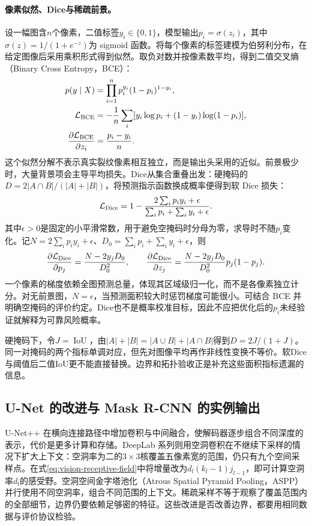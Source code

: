 \paragraph{像素似然、Dice与稀疏前景。}
设一幅图含$n$个像素，二值标签$y_i\in\{0,1\}$，模型输出$p_i=\sigma(z_i)$，其中$\sigma(z)=1/(1+e^{-z})$为 sigmoid 函数。将每个像素的标签建模为伯努利分布，在给定图像后采用乘积形式得到似然。取负对数并按像素数平均，得到二值交叉熵（Binary Cross Entropy，BCE）：
\begin{align}
 p(y\mid X)&=\prod_{i=1}^n p_i^{y_i}(1-p_i)^{1-y_i},\\
 \mathcal L_{\rm BCE}&=-\frac1n\sum_i[y_i\log p_i+(1-y_i)\log(1-p_i)],\\
 \frac{\partial\mathcal L_{\rm BCE}}{\partial z_i}&=\frac{p_i-y_i}{n}.
\end{align}
这个似然分解不表示真实裂纹像素相互独立，而是输出头采用的近似。前景极少时，大量背景项会主导平均损失。Dice从集合重叠出发：硬掩码的$D=2|A\cap B|/(|A|+|B|)$，将预测指示函数换成概率便得到软 Dice 损失：
\begin{equation}
 \mathcal L_{\rm Dice}=1-\frac{2\sum_i p_iy_i+\epsilon}{\sum_i p_i+\sum_i y_i+\epsilon}.
 \label{eq:vision-soft-dice}
\end{equation}
其中$\epsilon>0$是固定的小平滑常数，用于避免空掩码时分母为零，求导时不随$p_i$变化。记$N=2\sum_i p_iy_i+\epsilon$、$D_0=\sum_i p_i+\sum_i y_i+\epsilon$，则
\begin{equation}
 \frac{\partial\mathcal L_{\rm Dice}}{\partial p_j}
 =\frac{N-2y_jD_0}{D_0^2},\qquad
 \frac{\partial\mathcal L_{\rm Dice}}{\partial z_j}
 =\frac{N-2y_jD_0}{D_0^2}p_j(1-p_j).
\end{equation}
一个像素的梯度依赖全图预测总量，体现其区域级归一化，而不是各像素独立计分。对无前景图，$N=\epsilon$，当预测面积较大时惩罚梯度可能很小。可结合 BCE 并明确空掩码的评价约定。Dice也不是概率校准目标，因此不应把优化后的$p_i$未经验证就解释为可靠风险概率。

硬掩码下，令$J=\operatorname{IoU}$，由$|A|+|B|=|A\cup B|+|A\cap B|$得到$D=2J/(1+J)$。同一对掩码的两个指标单调对应，但先对图像平均再作非线性变换不等价。软Dice与阈值后二值IoU更不能直接替换。边界和拓扑验收正是补充这些面积指标遗漏的信息。

\subsection{U-Net 的改进与 Mask R-CNN 的实例输出}
U-Net++ 在横向连接路径中增加卷积与中间融合，使解码器逐步组合不同深度的表示，代价是更多计算和存储。DeepLab 系列则用空洞卷积在不继续下采样的情况下扩大上下文：空洞率为二的$3\times3$核覆盖五像素宽的范围，仍只有九个空间采样点。在式\eqref{eq:vision-receptive-field}中将增量改为$d_l(k_l-1)j_{l-1}$，即可计算空洞率$d_l$的感受野。空洞空间金字塔池化（Atrous Spatial Pyramid Pooling，ASPP）并行使用不同空洞率，组合不同范围的上下文。稀疏采样不等于观察了覆盖范围内的全部细节，边界仍要依赖足够密的特征。这些改进是否改善边界，都要用相同数据与评价协议检验。

